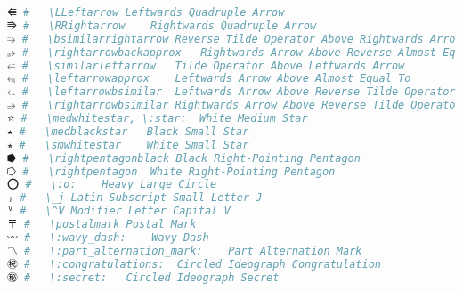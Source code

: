 \begin{lstlisting}[language=Julia, linewidth=\textwidth]
⭅ #   \LLeftarrow Leftwards Quadruple Arrow
⭆ #   \RRightarrow    Rightwards Quadruple Arrow
⭇ #   \bsimilarrightarrow Reverse Tilde Operator Above Rightwards Arrow
⭈ #   \rightarrowbackapprox   Rightwards Arrow Above Reverse Almost Equal To
⭉ #   \similarleftarrow   Tilde Operator Above Leftwards Arrow
⭊ #   \leftarrowapprox    Leftwards Arrow Above Almost Equal To
⭋ #   \leftarrowbsimilar  Leftwards Arrow Above Reverse Tilde Operator
⭌ #   \rightarrowbsimilar Rightwards Arrow Above Reverse Tilde Operator
⭐ #   \medwhitestar, \:star:  White Medium Star
⭑ #   \medblackstar   Black Small Star
⭒ #   \smwhitestar    White Small Star
⭓ #   \rightpentagonblack Black Right-Pointing Pentagon
⭔ #   \rightpentagon  White Right-Pointing Pentagon
⭕ #   \:o:    Heavy Large Circle
ⱼ #   \_j Latin Subscript Small Letter J
ⱽ #   \^V Modifier Letter Capital V
〒 #   \postalmark Postal Mark
〰 #   \:wavy_dash:    Wavy Dash
〽 #   \:part_alternation_mark:    Part Alternation Mark
㊗ #   \:congratulations:  Circled Ideograph Congratulation
㊙ #   \:secret:   Circled Ideograph Secret
\end{lstlisting}


